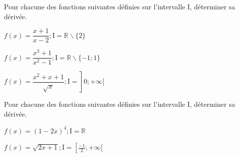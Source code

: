 \documentclass[11pt,a4paper]{article}  %
\begin{document}
\exercice{}

Pour chacune des fonctions suivantes définies sur l'intervalle I, déterminer sa dérivée.
\begin{enumMet}
	\item $f(x)=\dfrac{x+1}{x-2} ; \mathrm{I}=\mathbb{R} \backslash\{2\}$
	\item $f(x)=\dfrac{x^3+1}{x^2-1} ; \mathrm{I}=\mathbb{R} \backslash\{-1 ; 1\}$
	\item $\left.f(x)=\dfrac{x^2+x+1}{\sqrt{x}} ; \mathrm{I}=\right] 0 ;+\infty[$
\end{enumMet}

\exercice{}

Pour chacune des fonctions suivantes définies sur l'intervalle I, déterminer sa dérivée.
\begin{enumMet}
	\item $f(x)=(1-2 x)^4 ; \mathrm{I}=\mathbb{R}$
	\item $f(x)=\sqrt{2 x+1} ; \mathrm{I}=\left[\frac{-1}{2} ;+\infty[\right.$
\end{enumMet}
\end{document}
